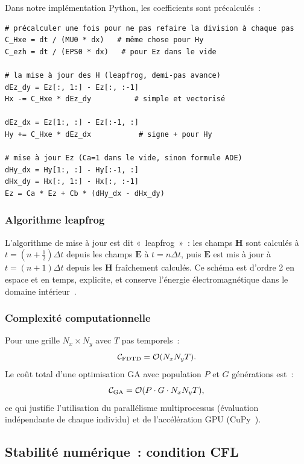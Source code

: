 \documentclass[12pt,a4paper]{article}
\newcommand{\vE}{\bm{E}}
\newcommand{\vH}{\bm{H}}
\newcommand{\dt}{\Delta t}
\newcommand{\half}{\tfrac{1}{2}}
\begin{document}
Dans notre implémentation Python, les coefficients sont précalculés~:
\begin{lstlisting}[caption={Coefficients de mise à jour FDTD (src/fdtd/core.py -- simplifiés)}]
# précalculer une fois pour ne pas refaire la division à chaque pas
C_Hxe = dt / (MU0 * dx)   # même chose pour Hy
C_ezh = dt / (EPS0 * dx)   # pour Ez dans le vide

# la mise à jour des H (leapfrog, demi-pas avance)
dEz_dy = Ez[:, 1:] - Ez[:, :-1]
Hx -= C_Hxe * dEz_dy          # simple et vectorisé

dEz_dx = Ez[1:, :] - Ez[:-1, :]
Hy += C_Hxe * dEz_dx           # signe + pour Hy

# mise à jour Ez (Ca=1 dans le vide, sinon formule ADE)
dHy_dx = Hy[1:, :] - Hy[:-1, :]
dHx_dy = Hx[:, 1:] - Hx[:, :-1]
Ez = Ca * Ez + Cb * (dHy_dx - dHx_dy)
\end{lstlisting}

\subsubsection{Algorithme leapfrog}

L'algorithme de mise à jour est dit «~leapfrog~»~: les champs $\vH$ sont calculés
à $t = (n+\half)\dt$ depuis les champs $\vE$ à $t = n\dt$, puis $\vE$ est mis à
jour à $t = (n+1)\dt$ depuis les $\vH$ fraîchement calculés. Ce schéma est
d'ordre 2 en espace et en temps, explicite, et conserve l'énergie électromagnétique
dans le domaine intérieur~\cite{Taflove2005}.

\subsubsection{Complexité computationnelle}

Pour une grille $N_x \times N_y$ avec $T$ pas temporels~:
\begin{equation}
    \mathcal{C}_{\rm FDTD} = \mathcal{O}(N_x N_y T).
    \label{eq:complexity-fdtd}
\end{equation}
Le coût total d'une optimisation GA avec population $P$ et $G$ générations est~:
\begin{equation}
    \mathcal{C}_{\rm GA} = \mathcal{O}(P \cdot G \cdot N_x N_y T),
    \label{eq:complexity-ga}
\end{equation}
ce qui justifie l'utilisation du parallélisme multiprocessus (évaluation indépendante
de chaque individu) et de l'accélération GPU (CuPy~\cite{CuPy2017}).

\subsection{Stabilité numérique~: condition CFL}
\label{ssec:cfl}
\end{document}
